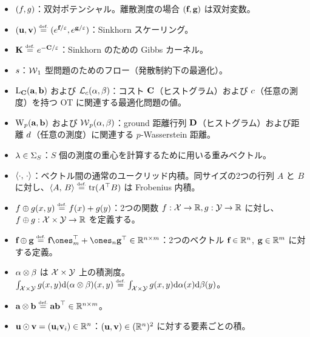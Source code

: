 \begin{itemize}
	\item $(\f,\g)$：双対ポテンシャル。離散測度の場合 $(\fD,\gD)$ は双対変数。
	\item $(\uD,\vD) \eqdef (e^{\fD/\varepsilon},e^{\gD/\varepsilon})$：Sinkhorn スケーリング。
	\item $\K \eqdef e^{-\C/\varepsilon}$：Sinkhorn のための Gibbs カーネル。
	\item $\flow$：$\Wass_1$ 型問題のためのフロー（発散制約下の最適化）。
	\item $\MKD_\C(\a,\b)$ および $\MK_\c(\al,\be)$：コスト $\C$（ヒストグラム）および $\c$（任意の測度）を持つ OT に関連する最適化問題の値。
	\item $\WassD_p(\a,\b)$ および $\Wass_p(\al,\be)$：ground 距離行列 $\distD$（ヒストグラム）および距離 $\dist$（任意の測度）に関連する $p$-Wasserstein 距離。
	\item $\lambda\in\simplex_S$：$S$ 個の測度の重心を計算するために用いる重みベクトル。
	\item $\dotp{\cdot}{\cdot}$：ベクトル間の通常のユークリッド内積。同サイズの2つの行列 $A$ と $B$ に対し、$\dotp{A}{B} \eqdef \trace(A^\top B)$ は Frobenius 内積。
	\item $\f\oplus \g(x,y) \eqdef f(x)+g(y)$：2つの関数 $\f : \X \rightarrow \RR, \g : \Y \rightarrow \RR$ に対し、$\f \oplus \g : \X\times \Y \rightarrow \RR$ を定義する。
	\item $\fD \oplus \gD \eqdef \fD \ones_m^\top + \ones_n \gD^\top \in \RR^{n\times m}$：2つのベクトル $\fD\in\RR^n$, $\gD\in\RR^m$ に対する定義。
	\item $\al \otimes \be$ は $\X \times \Y$ 上の積測度。\ie
		$\int_{\X \times \Y} g(x,y) \d(\al\otimes\be)(x,y) \eqdef \int_{\X \times \Y} g(x,y) \d\al(x) \d\be(y)$。
	\item $\a \otimes \b \eqdef \a \b^\top \in \RR^{n \times m}$。
	\item $\uD \odot \vD = (\uD_i \vD_i) \in \RR^n$：$(\uD, \vD) \in (\RR^n)^2$ に対する要素ごとの積。
\end{itemize}
